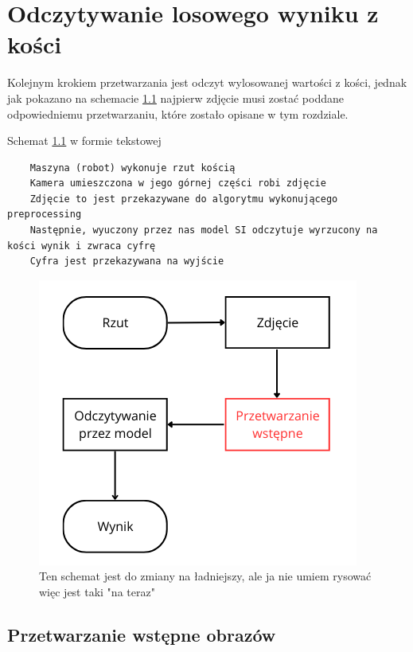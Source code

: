 \chapter{Odczytywanie losowego wyniku z kości}

Kolejnym krokiem przetwarzania jest odczyt wylosowanej wartości z kości,
jednak jak pokazano na schemacie \ref{fig:schemat_workflow}
najpierw zdjęcie musi zostać poddane odpowiedniemu przetwarzaniu, które zostało opisane w tym rozdziale.

Schemat \ref{fig:schemat_workflow} w formie tekstowej
\begin{verbatim}
    Maszyna (robot) wykonuje rzut kością
    Kamera umieszczona w jego górnej części robi zdjęcie
    Zdjęcie to jest przekazywane do algorytmu wykonującego preprocessing
    Następnie, wyuczony przez nas model SI odczytuje wyrzucony na kości wynik i zwraca cyfrę
    Cyfra jest przekazywana na wyjście
\end{verbatim}

\begin{figure}[H]
    \centering
    \includegraphics[width=\linewidth]{chapters/04-czytanie/figures/schemat}
    \caption{Ten schemat jest do zmiany na ładniejszy, ale ja nie umiem rysować więc jest taki "na teraz"}
    \label{fig:schemat_workflow}
\end{figure}

\section{Przetwarzanie wstępne obrazów}

